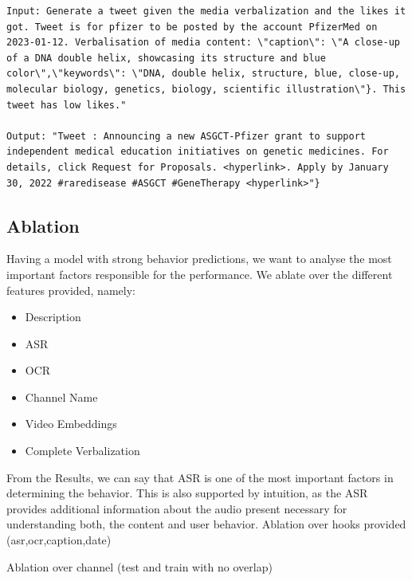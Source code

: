 \begin{lstlisting}[caption={Verbalization pattern of Twitter posts for the content simulation task:},frame=single,label={listing-twitter-content-simulation},basicstyle=\scriptsize]
Input: Generate a tweet given the media verbalization and the likes it got. Tweet is for pfizer to be posted by the account PfizerMed on 2023-01-12. Verbalisation of media content: \"caption\": \"A close-up of a DNA double helix, showcasing its structure and blue color\",\"keywords\": \"DNA, double helix, structure, blue, close-up, molecular biology, genetics, biology, scientific illustration\"}. This tweet has low likes." 

Output: "Tweet : Announcing a new ASGCT-Pfizer grant to support independent medical education initiatives on genetic medicines. For details, click Request for Proposals. <hyperlink>. Apply by January 30, 2022 #raredisease #ASGCT #GeneTherapy <hyperlink>"}
\end{lstlisting}








\iffalse

\subsection{Ablation}
Having a model with strong behavior predictions, we want to analyse the most important factors responsible for the performance.
We ablate over the different features provided, namely:
\begin{itemize}
    \item Description
    \item ASR
    \item OCR
    \item Channel Name
    \item Video Embeddings
    \item Complete Verbalization
\end{itemize}
From the Results, we can say that ASR is one of the most important factors in determining the behavior. This is also supported by intuition, as the ASR provides additional information about the audio present necessary for understanding both, the content and user behavior.
Ablation over hooks provided (asr,ocr,caption,date)


Ablation over channel (test and train with no overlap)

